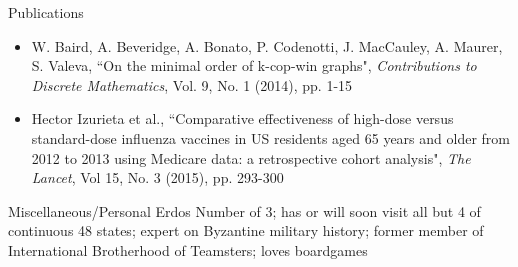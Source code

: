 \documentclass{resume} %
\begin{document}
\begin{rSection}{Publications}
\begin{itemize}
    \item W. Baird, A. Beveridge, A. Bonato, P. Codenotti, J. MacCauley, A. Maurer, S. Valeva, ``On the minimal order of k-cop-win graphs", {\em Contributions to Discrete Mathematics}, Vol. 9, No. 1 (2014), pp. 1-15 
    \item Hector Izurieta et al., ``Comparative effectiveness of high-dose versus standard-dose influenza vaccines in US residents aged 65 years and older from 2012 to 2013 using Medicare data: a retrospective cohort analysis", {\em The Lancet}, Vol 15, No. 3 (2015), pp. 293-300 
\end{itemize}
\end{rSection}



\begin{rSection}{Miscellaneous/Personal} 
    Erdos Number of 3; has or will soon visit all but 4 of continuous 48 states; expert on Byzantine military history; former member of International Brotherhood of Teamsters; loves boardgames 
\end{rSection}






\end{document}
